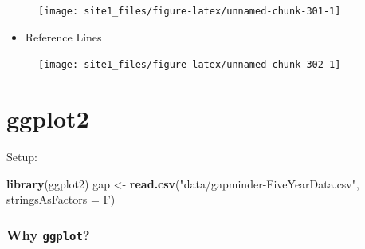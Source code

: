 \documentclass[]{book}
\newenvironment{Shaded}{\begin{snugshade}}{\end{snugshade}}
\newcommand{\KeywordTok}[1]{\textcolor[rgb]{0.13,0.29,0.53}{\textbf{#1}}}
\newcommand{\DataTypeTok}[1]{\textcolor[rgb]{0.13,0.29,0.53}{#1}}
\newcommand{\DecValTok}[1]{\textcolor[rgb]{0.00,0.00,0.81}{#1}}
\newcommand{\StringTok}[1]{\textcolor[rgb]{0.31,0.60,0.02}{#1}}
\newcommand{\CommentTok}[1]{\textcolor[rgb]{0.56,0.35,0.01}{\textit{#1}}}
\newcommand{\OperatorTok}[1]{\textcolor[rgb]{0.81,0.36,0.00}{\textbf{#1}}}
\newcommand{\NormalTok}[1]{#1}
\providecommand{\tightlist}{%
  \setlength{\itemsep}{0pt}\setlength{\parskip}{0pt}}
\begin{document}
\begin{figure}

{\centering \texttt{[image: site1\_files/figure-latex/unnamed-chunk-301-1]} 

}

\caption{ }\label{fig:unnamed-chunk-301}
\end{figure}

\begin{itemize}
\tightlist
\item
  Reference Lines
\end{itemize}

\begin{Shaded}
\end{Shaded}

\begin{figure}

{\centering \texttt{[image: site1\_files/figure-latex/unnamed-chunk-302-1]} 

}

\caption{ }\label{fig:unnamed-chunk-302}
\end{figure}

\section{ggplot2}\label{ggplot2}

Setup:

\begin{Shaded}
\begin{Highlighting}[]
\KeywordTok{library}\NormalTok{(ggplot2)}
\NormalTok{gap <-}\StringTok{ }\KeywordTok{read.csv}\NormalTok{(}\StringTok{"data/gapminder-FiveYearData.csv"}\NormalTok{, }\DataTypeTok{stringsAsFactors =}\NormalTok{ F)}
\end{Highlighting}
\end{Shaded}

\subsubsection*{\texorpdfstring{Why
\texttt{ggplot}?}{Why ggplot?}}\label{why-ggplot}
\end{document}
